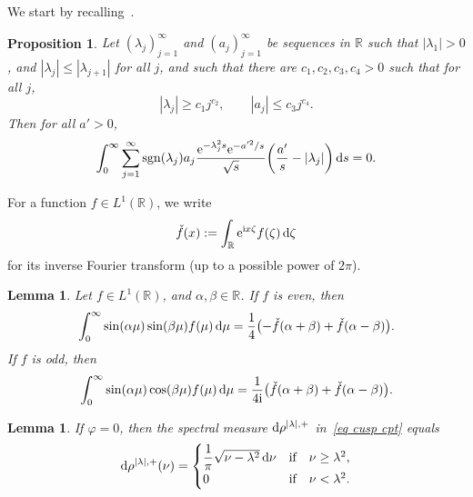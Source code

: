 \documentclass[10pt,a4paper]{amsart}
\numberwithin{equation}{section}
\newtheorem{Lemma}[Theorem]{Lemma}
\newtheorem{Proposition}[Theorem]{Proposition}
 { \theoremstyle{definition}
\newtheorem{Definition}[Theorem]{Definition}
\newtheorem{Note}[Theorem]{Note}
\newtheorem{Example}[Theorem]{Example}
\newtheorem{Remark}[Theorem]{Remark} }
\DeclareMathOperator{\sgn}{sgn}
\newcommand{\R}{\mathbb{R}}
\begin{document}
We start by recalling~\cite[Proposition~5.1]{HW21a}.
\begin{Proposition}\label{prop vanish}
Let $(\lambda_j)_{j=1}^{\infty}$ and $(a_j)_{j=1}^{\infty}$ be sequences in $\R$ such that $|\lambda_1|>0$, and $|\lambda_j| \leq |\lambda_{j+1}|$ for all $j$, and such that
there are $c_1,c_2, c_3, c_4>0$ such that for all $j$,
\begin{equation*} %
|\lambda_j| \geq c_1 j^{c_2},\qquad |a_j| \leq c_3 j^{c_4}.
\end{equation*}
Then for all $a'>0$,
\begin{equation*}%
\int_0^{\infty} \sum_{j=1}^{\infty} \sgn(\lambda_j) a_j \frac{{\rm e}^{-\lambda_j^2 s} {\rm e}^{-a'^2/s}}{\sqrt{s}} \bigg(\frac{a'}{s} - |\lambda_j| \bigg) \, {\rm d}s = 0.
\end{equation*}
\end{Proposition}

For a function $f \in L^1(\R)$, we write
\[
\check{f}(x) := \int_{\R} {\rm e}^{{\rm i}x\zeta} f(\zeta)\, {\rm d}\zeta
\]
for its inverse Fourier transform (up to a possible power of $2\pi$).
\begin{Lemma}\label{lem IFT}
Let $f \in L^1(\R)$, and $\alpha,\beta \in \R$.
If $f$ is even, then
\[
\int_0^{\infty}\sin(\alpha\mu)\sin(\beta\mu)f(\mu)\,{\rm d}\mu=\frac14 \bigl( -\check{f}(\alpha+\beta)+\check{f}(\alpha-\beta) \bigr).
\]
If $f$ is odd, then
\[
\int_0^{\infty}\sin(\alpha\mu)\cos(\beta\mu)f(\mu)\,{\rm d}\mu=\frac1{4{\rm i}}\bigl( \check{f}(\alpha+\beta)+\check{f}(\alpha-\beta)\bigr).
\]
\end{Lemma}

\begin{Lemma}\label{lem rho cyl}
If $\varphi = 0$, then the spectral measure ${\rm d}\rho^{|\lambda|, +}$ in~\eqref{eq cusp cpt} equals
\[
{\rm d}\rho^{|\lambda|, +}(\nu)
=\begin{cases}\dfrac{1}{\pi}\sqrt{\nu-\lambda^2}\,{\rm d}\nu &\text{if\quad $\nu\ge\lambda^2$},
\\
0 & \text{if\quad $\nu<\lambda^2$}. \end{cases}
\]
\end{Lemma}
\end{document}
